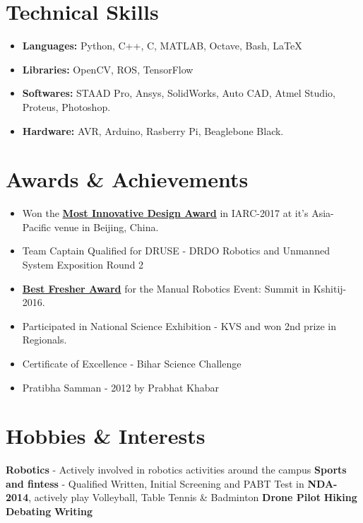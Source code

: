 \documentclass[letterpaper,11pt]{article}
\begin{document}
\section{Technical Skills}
\begin{itemize}
\setlength\itemsep{0em}
    \item \textbf{Languages: }Python, C++, C, MATLAB, Octave, Bash, \LaTeX
    \item \textbf{Libraries: }OpenCV, ROS, TensorFlow
    \item \textbf{Softwares: }STAAD Pro, Ansys, SolidWorks, Auto CAD, Atmel Studio, Proteus, Photoshop.
    \item \textbf{Hardware: }AVR, Arduino, Rasberry Pi, Beaglebone Black.
\end{itemize}
 \section{Awards \& Achievements}
 \begin{itemize}
 \setlength\itemsep{0em}
 \item Won the \textcolor{cyan}{\href{https://drive.google.com/file/d/13e58dQRzgkfGEMpesHmXU6ZWWJVZ9x_B/view?usp=sharing}{\textbf{Most Innovative Design Award}}} in IARC-2017 at it's Asia-Pacific venue in Beijing, China.
 \item Team Captain \textbar \textbf{ }Qualified for DRUSE - DRDO Robotics and Unmanned System Exposition Round 2
 \item \textbf{\textcolor{cyan}{\href{https://drive.google.com/file/d/1DRTkX94YzHKDueM7lv9TGNJwJDxM9Vpy/view?usp=sharing}{Best Fresher Award}}} for the Manual Robotics Event: Summit in Kshitij-2016.
 \item Participated in National Science Exhibition - KVS and won 2nd prize in Regionals.
 \item Certificate of Excellence - Bihar Science Challenge
 \item Pratibha Samman - 2012 by Prabhat Khabar
 \end{itemize}
\section{Hobbies \& Interests}
\textbf{Robotics} - Actively involved in robotics activities around the campus \textbar  \textbf{ Sports and fintess} - Qualified Written, Initial Screening and PABT Test
in \textbf{NDA-2014}, actively play Volleyball, Table Tennis \& Badminton \textbar \textbf{ Drone Pilot} \textbar \textbf{ Hiking} \textbar  \textbf{ Debating} \textbar  \textbf{ Writing} 
\end{document}
